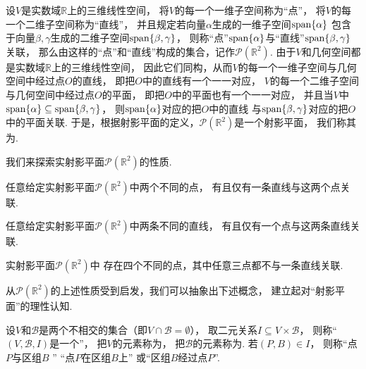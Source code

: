 设\(V\)是实数域\(\mathbb{R}\)上的三维线性空间，
将\(V\)的每一个一维子空间称为“点”，
将\(V\)的每一个二维子空间称为“直线”，
并且规定若向量\(\alpha\)生成的一维子空间\(\operatorname{span}\{\alpha\}\)
包含于向量\(\beta,\gamma\)生成的二维子空间\(\operatorname{span}\{\beta,\gamma\}\)，
则称“点”\(\operatorname{span}\{\alpha\}\)与“直线”\(\operatorname{span}\{\beta,\gamma\}\)关联，
那么由这样的“点”和“直线”构成的集合，记作\(\mathcal{P}(\mathbb{R}^2)\).
由于\(V\)和几何空间都是实数域\(\mathbb{R}\)上的三维线性空间，
因此它们同构，从而\(V\)的每一个一维子空间与几何空间中经过点\(O\)的直线，
即把\(O\)中的直线有一个一一对应，
\(V\)的每一个二维子空间与几何空间中经过点\(O\)的平面，
即把\(O\)中的平面也有一个一一对应，
并且当\(V\)中\(\operatorname{span}\{\alpha\} \subseteq \operatorname{span}\{\beta,\gamma\}\)，
则\(\operatorname{span}\{\alpha\}\)对应的把\(O\)中的直线
与\(\operatorname{span}\{\beta,\gamma\}\)对应的把\(O\)中的平面关联.
于是，根据射影平面的定义，\(\mathcal{P}(\mathbb{R}^2)\)是一个射影平面，
我们称其为.

我们来探索实射影平面\(\mathcal{P}(\mathbb{R}^2)\)的性质.

\begin{property}
任意给定实射影平面\(\mathcal{P}(\mathbb{R}^2)\)中两个不同的点，
有且仅有一条直线与这两个点关联.
\end{property}

\begin{property}
任意给定实射影平面\(\mathcal{P}(\mathbb{R}^2)\)中两条不同的直线，
有且仅有一个点与这两条直线关联.
\end{property}

\begin{property}
实射影平面\(\mathcal{P}(\mathbb{R}^2)\)中
存在四个不同的点，其中任意三点都不与一条直线关联.
\end{property}

从\(\mathcal{P}(\mathbb{R}^2)\)的上述性质受到启发，我们可以抽象出下述概念，
建立起对“射影平面”的理性认知.

\begin{definition}
设\(V\)和\(\mathscr{B}\)是两个不相交的集合（即\(V \cap \mathscr{B} = \emptyset\)），
取二元关系\(I \subseteq V \times \mathscr{B}\)，
则称“\((V,\mathscr{B},I)\)是一个”，
把\(V\)的元素称为，
把\(\mathscr{B}\)的元素称为.
若\((P,B) \in I\)，
则称“点\(P\)与区组\(B\) ”
“点\(P\)在区组\(B\)上”
或“区组\(B\)经过点\(P\)”.
\end{definition}

